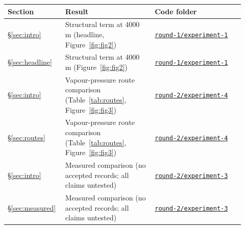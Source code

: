 \documentclass[11pt,letterpaper]{article}
\begin{document}
\begin{longtable}{p{0.2\linewidth}p{0.36\linewidth}p{0.36\linewidth}}
  \toprule
  Section & Result & Code folder \\
  \midrule
  \endhead
  \S\ref{sec:intro} & Structural term at 4000 m (headline, Figure~\ref{fig:fig2}) & \href{https://github.com/ai-inventor-papers/ai-invention-afc680-barometric-formula-predicts-waters/tree/main/round-1/experiment-1}{\texttt{round-1/experiment-1}} \\
  \S\ref{sec:headline} & Structural term at 4000 m (Figure~\ref{fig:fig2}) & \href{https://github.com/ai-inventor-papers/ai-invention-afc680-barometric-formula-predicts-waters/tree/main/round-1/experiment-1}{\texttt{round-1/experiment-1}} \\
  \S\ref{sec:intro} & Vapour-pressure route comparison (Table~\ref{tab:routes}, Figure~\ref{fig:fig3}) & \href{https://github.com/ai-inventor-papers/ai-invention-afc680-barometric-formula-predicts-waters/tree/main/round-2/experiment-4}{\texttt{round-2/experiment-4}} \\
  \S\ref{sec:routes} & Vapour-pressure route comparison (Table~\ref{tab:routes}, Figure~\ref{fig:fig3}) & \href{https://github.com/ai-inventor-papers/ai-invention-afc680-barometric-formula-predicts-waters/tree/main/round-2/experiment-4}{\texttt{round-2/experiment-4}} \\
  \S\ref{sec:intro} & Measured comparison (no accepted records; all claims untested) & \href{https://github.com/ai-inventor-papers/ai-invention-afc680-barometric-formula-predicts-waters/tree/main/round-2/experiment-3}{\texttt{round-2/experiment-3}} \\
  \S\ref{sec:measured} & Measured comparison (no accepted records; all claims untested) & \href{https://github.com/ai-inventor-papers/ai-invention-afc680-barometric-formula-predicts-waters/tree/main/round-2/experiment-3}{\texttt{round-2/experiment-3}} \\
  \bottomrule
\end{longtable}
\end{document}
